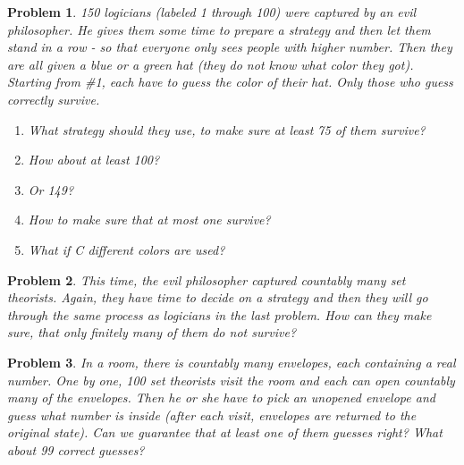 \documentclass[11pt,a5paper]{article}
\newtheorem{problem}{Problem}
\begin{document}
\begin{problem}
150 logicians (labeled 1 through 100) were captured by an evil philosopher. He gives them some time to prepare a strategy and then let them stand in a row - so that everyone only sees people with higher number. Then they are all given a blue or a green hat (they do not know what color they got). Starting from \#1, each have to guess the color of their hat. Only those who guess correctly survive.
\begin{enumerate}
\item What strategy should they use, to make sure at least 75 of them survive?
\item How about at least 100?
\item Or 149?
\item How to make sure that at most one survive?
\item What if C different colors are used?
\end{enumerate}
\end{problem}
\begin{problem}
This time, the evil philosopher captured countably many set theorists. Again, they have time to decide on a strategy and then they will go through the same process as logicians in the last problem. How can they make sure, that only finitely many of them do not survive?
\end{problem}

\begin{problem}
In a room, there is countably many envelopes, each containing a real number. One by one, 100 set theorists visit the room and each can open countably many of the envelopes. Then he or she have to pick an unopened envelope and guess what number is inside (after each visit, envelopes are returned to the original state). Can we guarantee that at least one of them guesses right? What about 99 correct guesses?
\end{problem}
\end{document}
